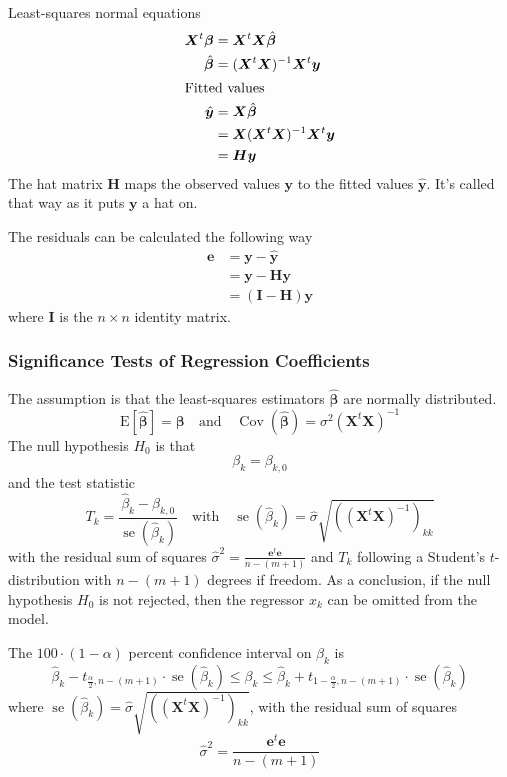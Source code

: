 \documentclass[11pt]{article}
\theoremstyle{definition}
\newcommand*\ev[1]{\mathrel{\text{E}\left[#1\right]}}
\newcommand*\Cov[1]{\mathop{\text{Cov}}\left(#1\right)}
\newcommand*\se[1]{\mathop{\text{se}}\left(#1\right)}
\begin{document}
Least-squares normal equations
\begin{align*}
	\bm{X}^t\bm{\beta} &= \bm{X}^t\bm{X}\hat{\bm{\beta}}\\
	\hat{\bm{\beta}} &= (\bm{X}^t\bm{X})^{-1}\bm{X}^t\bm{y}\\
	\intertext{Fitted values}
	\hat{\bm{y}} &= \bm{X}\hat{\bm{\beta}}\\
	&= \bm{X}(\bm{X}^t\bm{X})^{-1}\bm{X}^t\bm{y}\\
	&= \bm{H}\bm{y}
\end{align*}
The hat matrix $\bm{H}$ maps the observed values $\bm{y}$ to the fitted values $\hat{\bm{y}}$. It's called that way as it puts $\bm{y}$ a hat on.

The residuals can be calculated the following way
\begin{align*}
	\bm{e} &= \bm{y} - \hat{\bm{y}}\\
	&= \bm{y} - \bm{H}\bm{y}\\
	&= (\bm{I} - \bm{H}) \bm{y}
\end{align*}
where $\bm{I}$ is the $n\times n$ identity matrix.

\subsubsection{Significance Tests of Regression Coefficients}
The assumption is that the least-squares estimators $\hat{\bm{\beta}}$ are normally distributed.
\begin{equation*}
	\ev{\hat{\bm{\beta}}} = \bm{\beta}\quad\text{and}\quad\Cov{\hat{\bm{\beta}}} = \sigma^2(\bm{X}^t\bm{X})^{-1}
\end{equation*}
The null hypothesis $H_0$ is that
\begin{equation*}
	\beta_k = \beta_{k,0}
\end{equation*}
and the test statistic
\begin{equation*}
	T_k = \frac{\hat{\beta}_k - \beta_{k,0}}{\se{\hat{\beta}_k}}\quad\text{with}\quad\se{\hat{\beta}_k} = \hat{\sigma}\sqrt{\left((\bm{X}^t\bm{X})^{-1}\right)_{kk}}
\end{equation*}
with the residual sum of squares $\hat{\sigma}^2 = \frac{\bm{e}^t\bm{e}}{n-(m+1)}$ and $T_k$ following a Student's $t$-distribution with $n-(m+1)$ degrees if freedom. As a conclusion, if the null hypothesis $H_0$ is not rejected, then the regressor $x_k$ can be omitted from the model.

The $100\cdot(1-\alpha)$ percent confidence interval on $\beta_k$ is
\begin{equation*}
	\hat{\beta}_k - t_{\frac{\alpha}{2},n-(m+1)}\cdot\se{\hat{\beta}_k} \leq \beta_k \leq \hat{\beta}_k + t_{1 - \frac{\alpha}{2},n-(m+1)}\cdot\se{\hat{\beta}_k}
\end{equation*}
where $\se{\hat{\beta}_k} = \hat{\sigma}\sqrt{\left((\bm{X}^t\bm{X})^{-1}\right)_{kk}}$, with the residual sum of squares
\begin{equation*}
	\hat{\sigma}^2 = \frac{\bm{e}^t\bm{e}}{n-(m+1)}
\end{equation*}
\end{document}
